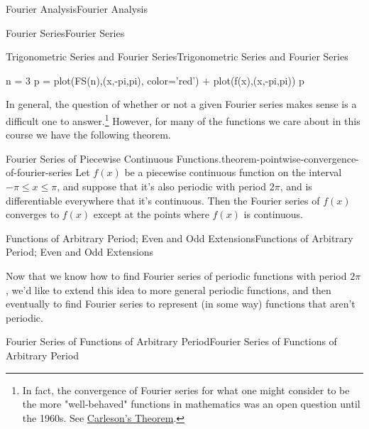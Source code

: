 \documentclass[10pt,]{book}
\numberwithin{equation}{section}
\begin{document}
\begin{chapterptx}{Fourier Analysis}{}{Fourier Analysis}{}{}
\begin{sectionptx}{Fourier Series}{}{Fourier Series}{}{}
\begin{subsectionptx}{Trigonometric Series and Fourier Series}{}{Trigonometric Series and Fourier Series}{}{}
\begin{sageinput}
n = 3
p = plot(FS(n),(x,-pi,pi), color='red') + plot(f(x),(x,-pi,pi))
p
\end{sageinput}
\hypertarget{p-391}{}%
In general, the question of whether or not a given Fourier series makes sense is a difficult one to answer.\footnote{In fact, the convergence of Fourier series for what one might consider to be the more "well-behaved" functions in mathematics was an open question until the 1960s. See \href{https://en.wikipedia.org/wiki/Carleson\%27s_theorem}{Carleson's Theorem}.\label{footnote-convergence-of-fourier-series}} However, for many of the functions we care about in this course we have the following theorem.%
\begin{theorem}{Fourier Series of Piecewise Continuous Functions.}{}{theorem-pointwise-convergence-of-fourier-series}%
\hypertarget{p-392}{}%
Let \(f(x)\) be a piecewise continuous function on the interval \(-\pi\leq x\leq\pi\), and suppose that it's also periodic with period \(2\pi\), and is differentiable everywhere that it's continuous. Then the Fourier series of \(f(x)\) converges to \(f(x)\) except at the points where \(f(x)\) is continuous.%
\end{theorem}
\end{subsectionptx}
\end{sectionptx}
%
%
\typeout{************************************************}
\typeout{************************************************}
%
\begin{sectionptx}{Functions of Arbitrary Period; Even and Odd Extensions}{}{Functions of Arbitrary Period; Even and Odd Extensions}{}{}\label{section-functions-of-arbitrary-period-even-and-odd-extensions}
\begin{introduction}{}%
\hypertarget{p-393}{}%
Now that we know how to find Fourier series of periodic functions with period \(2\pi\), we'd like to extend this idea to more general periodic functions, and then eventually to find Fourier series to represent (in some way) functions that aren't periodic.%
\end{introduction}%
%
%
\typeout{************************************************}
\typeout{************************************************}
%
\begin{subsectionptx}{Fourier Series of Functions of Arbitrary Period}{}{Fourier Series of Functions of Arbitrary Period}{}{}\label{subsection-fourier-series-of-functions-of-arbitrary-period}

\end{subsectionptx}
\end{sectionptx}
\end{chapterptx}
\end{document}
